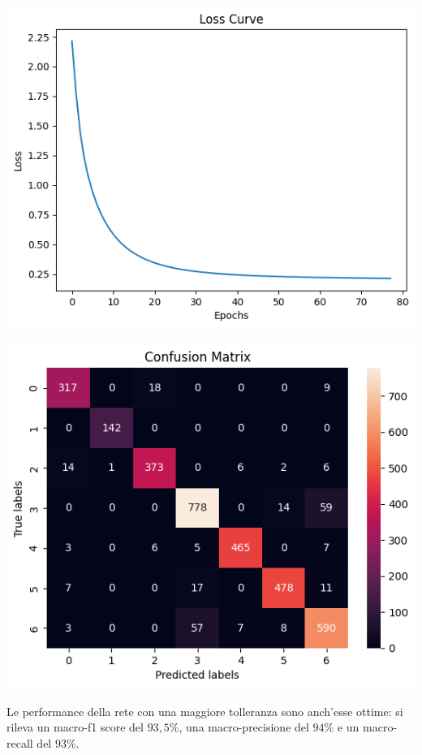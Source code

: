\begin{Figure}
    \centering
    \includegraphics[width=0.9\linewidth]{img/mlp_high_loss.png}
\end{Figure}

\begin{Figure}
    \centering
    \includegraphics[width=\linewidth]{img/mlp_high_confusion_matrix.png}
\end{Figure}

Le performance della rete con una maggiore tolleranza sono anch'esse ottime:
si rileva un macro-f1 score del $93,5\%$, 
una macro-precisione del $94\%$ e un macro-recall del $93\%$.

